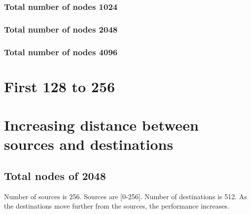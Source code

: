 \documentclass[letter]{article}
\begin{document}
\subsubsection{Total number of nodes 1024}





\clearpage
\newpage

\subsubsection {Total number of nodes 2048}





\clearpage
\newpage

\subsubsection {Total number of nodes 4096}





\clearpage
\newpage


\section{First 128 to 256}

\section {Increasing distance between sources and destinations}

\subsection{Total nodes of 2048}

Number of sources is 256. Sources are [0-256]. Number of destinations is 512. As the destinations move further from the sources, the performance increases.
\end{document}

